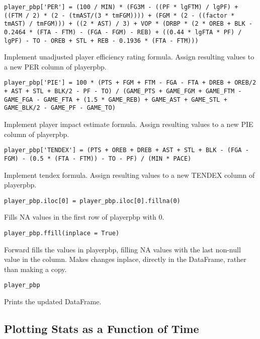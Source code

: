 \documentclass{article}
\begin{document}
\begin{lstlisting}
player_pbp['PER'] = (100 / MIN) * (FG3M - ((PF * lgFTM) / lgPF) + ((FTM / 2) * (2 - (tmAST/(3 * tmFGM)))) + (FGM * (2 - ((factor * tmAST) / tmFGM))) + ((2 * AST) / 3) + VOP * (DRBP * (2 * OREB + BLK - 0.2464 * (FTA - FTM) - (FGA - FGM) - REB) + ((0.44 * lgFTA * PF) / lgPF) - TO - OREB + STL + REB - 0.1936 * (FTA - FTM)))
\end{lstlisting}
Implement unadjusted player efficiency rating formula. Assign resulting values to a new PER column of player\textunderscore pbp.
\begin{lstlisting}
player_pbp['PIE'] = 100 * (PTS + FGM + FTM - FGA - FTA + DREB + OREB/2 + AST + STL + BLK/2 - PF - TO) / (GAME_PTS + GAME_FGM + GAME_FTM - GAME_FGA - GAME_FTA + (1.5 * GAME_REB) + GAME_AST + GAME_STL + GAME_BLK/2 - GAME_PF - GAME_TO)
\end{lstlisting}
Implement player impact estimate formula. Assign resulting values to a new PIE column of player\textunderscore pbp.
\begin{lstlisting}
player_pbp['TENDEX'] = (PTS + OREB + DREB + AST + STL + BLK - (FGA - FGM) - (0.5 * (FTA - FTM)) - TO - PF) / (MIN * PACE)
\end{lstlisting}
Implement tendex formula. Assign resulting values to a new TENDEX column of player\textunderscore pbp.
\begin{lstlisting}
player_pbp.iloc[0] = player_pbp.iloc[0].fillna(0)
\end{lstlisting}
Fills NA values in the first row of player\textunderscore pbp with 0.
\begin{lstlisting}
player_pbp.ffill(inplace = True)
\end{lstlisting}
Forward fills the values in player\textunderscore pbp, filling NA values with the last non-null value in the column. Makes changes inplace, directly in the DataFrame, rather than making a copy.
\begin{lstlisting}
player_pbp
\end{lstlisting}
Prints the updated DataFrame.

\subsection{Plotting Stats as a Function of Time}
\end{document}
